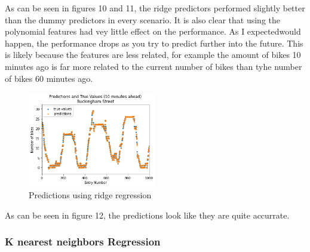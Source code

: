 As can be seen in figures 10 and 11, 
the ridge predictors performed slightly better than the dummy predictors in every scenario.
It is also clear that using the polynomial features had vey little effect on the performance.
As I expectedwould happen, the performance drops as you try to predict further into the future.
This is likely because the features are less related, 
for example the amount of bikes 10 minutes ago is far more related to the current number of bikes than tyhe number of bikes 60 minutes ago.

\begin{figure}[H]
    \centering
    \includegraphics[width=0.5\textwidth]{images/preds1.png}
    \caption{Predictions using ridge regression}
    \end{figure}
\par

As can be seen in figure 12, the predictions look like they are quite accurrate.

\subsubsection{K nearest neighbors Regression}

